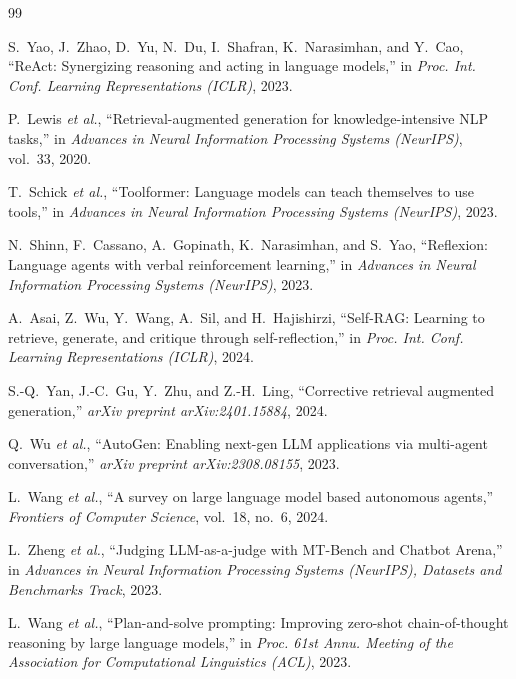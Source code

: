 \begin{thebibliography}{99}

 S.~Yao, J.~Zhao, D.~Yu, N.~Du, I.~Shafran, K.~Narasimhan, and Y.~Cao,
``ReAct: Synergizing reasoning and acting in language models,'' in \emph{Proc. Int. Conf. Learning
Representations (ICLR)}, 2023.

 P.~Lewis \emph{et al.}, ``Retrieval-augmented generation for knowledge-intensive
NLP tasks,'' in \emph{Advances in Neural Information Processing Systems (NeurIPS)}, vol.~33, 2020.

 T.~Schick \emph{et al.}, ``Toolformer: Language models can teach
themselves to use tools,'' in \emph{Advances in Neural Information Processing Systems (NeurIPS)}, 2023.

 N.~Shinn, F.~Cassano, A.~Gopinath, K.~Narasimhan, and S.~Yao,
``Reflexion: Language agents with verbal reinforcement learning,'' in \emph{Advances in Neural
Information Processing Systems (NeurIPS)}, 2023.

 A.~Asai, Z.~Wu, Y.~Wang, A.~Sil, and H.~Hajishirzi, ``Self-RAG: Learning to
retrieve, generate, and critique through self-reflection,'' in \emph{Proc. Int. Conf. Learning
Representations (ICLR)}, 2024.

 S.-Q.~Yan, J.-C.~Gu, Y.~Zhu, and Z.-H.~Ling, ``Corrective retrieval augmented
generation,'' \emph{arXiv preprint arXiv:2401.15884}, 2024.

 Q.~Wu \emph{et al.}, ``AutoGen: Enabling next-gen LLM applications via
multi-agent conversation,'' \emph{arXiv preprint arXiv:2308.08155}, 2023.

 L.~Wang \emph{et al.}, ``A survey on large language model based autonomous
agents,'' \emph{Frontiers of Computer Science}, vol.~18, no.~6, 2024.

 L.~Zheng \emph{et al.}, ``Judging LLM-as-a-judge with MT-Bench and Chatbot
Arena,'' in \emph{Advances in Neural Information Processing Systems (NeurIPS), Datasets and Benchmarks
Track}, 2023.

 L.~Wang \emph{et al.}, ``Plan-and-solve prompting: Improving zero-shot
chain-of-thought reasoning by large language models,'' in \emph{Proc. 61st Annu. Meeting of the
Association for Computational Linguistics (ACL)}, 2023.


\end{thebibliography}
